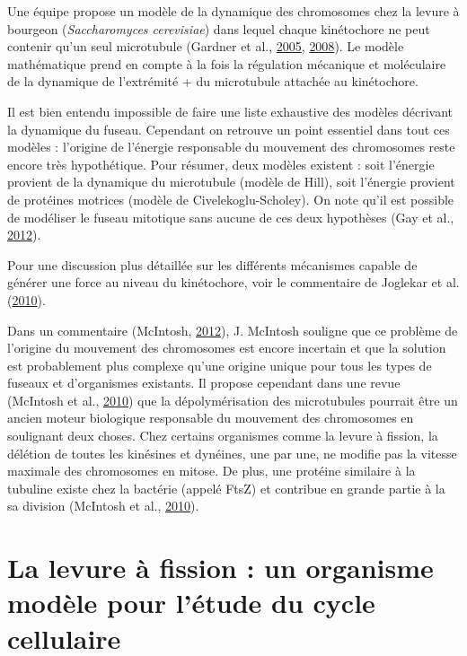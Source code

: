 \documentclass[12pt,a4paper,twoside,openright]{book}
\begin{document}
Une équipe propose un modèle de la dynamique des chromosomes chez la
levure à bourgeon (\emph{Saccharomyces cerevisiae}) dans lequel chaque
kinétochore ne peut contenir qu'un seul microtubule (Gardner et al.,
\protect\hyperlink{ref-Gardner2005}{2005},
\protect\hyperlink{ref-Gardner2008a}{2008}). Le modèle mathématique
prend en compte à la fois la régulation mécanique et moléculaire de la
dynamique de l'extrémité + du microtubule attachée au kinétochore.

Il est bien entendu impossible de faire une liste exhaustive des modèles
décrivant la dynamique du fuseau. Cependant on retrouve un point
essentiel dans tout ces modèles : l'origine de l'énergie responsable du
mouvement des chromosomes reste encore très hypothétique. Pour résumer,
deux modèles existent : soit l'énergie provient de la dynamique du
microtubule (modèle de Hill), soit l'énergie provient de protéines
motrices (modèle de Civelekoglu-Scholey). On note qu'il est possible de
modéliser le fuseau mitotique sans aucune de ces deux hypothèses (Gay et
al., \protect\hyperlink{ref-Gay2012a}{2012}).

Pour une discussion plus détaillée sur les différents mécanismes capable
de générer une force au niveau du kinétochore, voir le commentaire de
Joglekar et al. (\protect\hyperlink{ref-Joglekar2010a}{2010}).

Dans un commentaire (McIntosh,
\protect\hyperlink{ref-McIntosh2012}{2012}), J. McIntosh souligne que ce
problème de l'origine du mouvement des chromosomes est encore incertain
et que la solution est probablement plus complexe qu'une origine unique
pour tous les types de fuseaux et d'organismes existants. Il propose
cependant dans une revue (McIntosh et al.,
\protect\hyperlink{ref-McIntosh2010}{2010}) que la dépolymérisation des
microtubules pourrait être un ancien moteur biologique responsable du
mouvement des chromosomes en soulignant deux choses. Chez certains
organismes comme la levure à fission, la délétion de toutes les
kinésines et dynéines, une par une, ne modifie pas la vitesse maximale
des chromosomes en mitose. De plus, une protéine similaire à la tubuline
existe chez la bactérie (appelé FtsZ) et contribue en grande partie à la
sa division (McIntosh et al.,
\protect\hyperlink{ref-McIntosh2010}{2010}).

\section{La levure à fission : un organisme modèle pour l'étude du cycle
cellulaire}\label{la-levure-uxe0-fission-un-organisme-moduxe8le-pour-luxe9tude-du-cycle-cellulaire}
\end{document}
